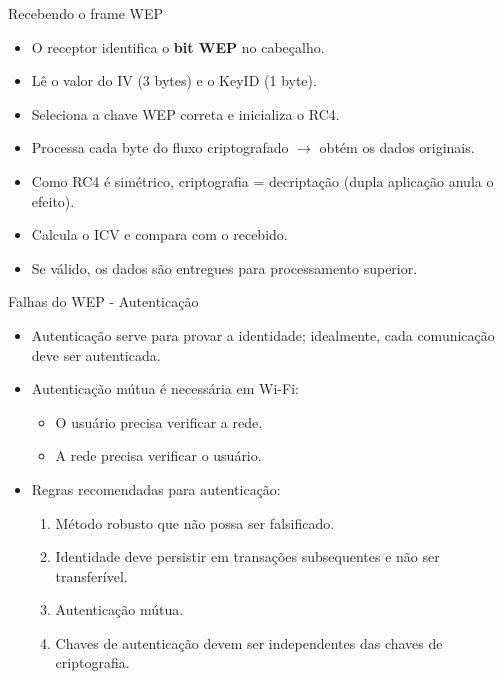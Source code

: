 \begin{frame}{Recebendo o frame WEP}
    \begin{itemize}
        \item O receptor identifica o \textbf{bit WEP} no cabeçalho.
        \item Lê o valor do IV (3 bytes) e o KeyID (1 byte).
        \item Seleciona a chave WEP correta e inicializa o RC4.
        \item Processa cada byte do fluxo criptografado $\rightarrow$ obtém os dados originais.
        \item Como RC4 é simétrico, criptografia = decriptação (dupla aplicação anula o efeito).
        \item Calcula o ICV e compara com o recebido.
        \item Se válido, os dados são entregues para processamento superior.
    \end{itemize}
\end{frame}


\begin{frame}{Falhas do WEP - Autenticação}
    \begin{itemize}
        \item Autenticação serve para provar a identidade; idealmente, cada comunicação deve ser autenticada.
        \item Autenticação mútua é necessária em Wi-Fi:
        \begin{itemize}
            \item O usuário precisa verificar a rede.
            \item A rede precisa verificar o usuário.
        \end{itemize}
        \item Regras recomendadas para autenticação:
        \begin{enumerate}
            \item Método robusto que não possa ser falsificado.
            \item Identidade deve persistir em transações subsequentes e não ser transferível.
            \item Autenticação mútua.
            \item Chaves de autenticação devem ser independentes das chaves de criptografia.
        \end{enumerate}
    \end{itemize}
\end{frame}

